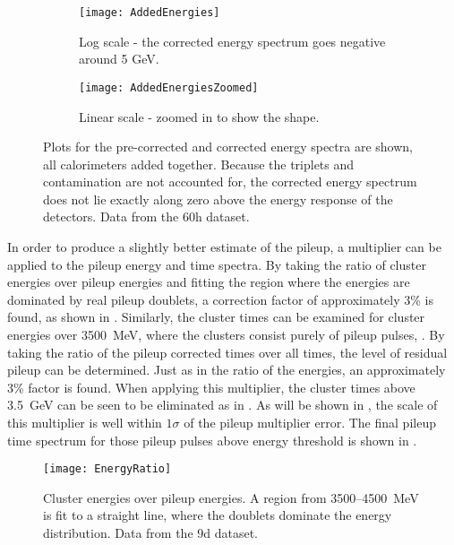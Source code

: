     \begin{figure}[]
    \centering
        \begin{subfigure}[]{0.45\textwidth}
            \centering
            \texttt{[image: AddedEnergies]}
            \caption{Log scale - the corrected energy spectrum goes negative around 5 GeV.}
        \end{subfigure}%
        \hspace{1cm}
        \begin{subfigure}[]{0.45\textwidth}
            \centering
            \texttt{[image: AddedEnergiesZoomed]}
            \caption{Linear scale - zoomed in to show the shape.}
        \end{subfigure}
    \caption[Non-corrected and pileup corrected cluster energies]{Plots for the pre-corrected and corrected energy spectra are shown, all calorimeters added together. Because the triplets and contamination are not accounted for, the corrected energy spectrum does not lie exactly along zero above the energy response of the detectors. Data from the 60h dataset.}
    \label{fig:AddedEnergies}
    \end{figure}



In order to produce a slightly better estimate of the pileup, a multiplier can be applied to the pileup energy and time spectra. By taking the ratio of cluster energies over pileup energies and fitting the region where the energies are dominated by real pileup doublets, a correction factor of approximately 3\% is found, as shown in . Similarly, the cluster times can be examined for cluster energies over \SI{3500}{\MeV}, where the clusters consist purely of pileup pulses, . By taking the ratio of the pileup corrected times over all times, the level of residual pileup can be determined. Just as in the ratio of the energies, an approximately 3\% factor is found. When applying this multiplier, the cluster times above \SI{3.5}{\GeV} can be seen to be eliminated as in . As will be shown in , the scale of this multiplier is well within $1\sigma$ of the pileup multiplier error. The final pileup time spectrum for those pileup pulses above energy threshold is shown in . 


    \begin{figure}[]
        \centering
        \texttt{[image: EnergyRatio]}
        \caption[Cluster energies divided by pileup energies]{Cluster energies over pileup energies. A region from \SI{3500}{}--\SI{4500}{\MeV} is fit to a straight line, where the doublets dominate the energy distribution. Data from the 9d dataset.}    
        \label{fig:EnergyRatio}
    \end{figure}


